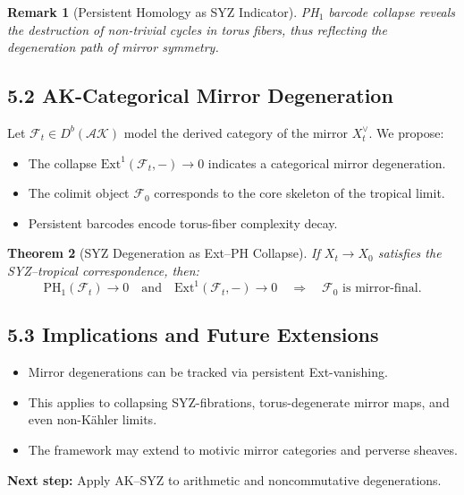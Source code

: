 \documentclass[11pt]{article}
\newtheorem{theorem}{Theorem}[section]
\newtheorem{remark}[theorem]{Remark}
\begin{document}
\begin{remark}[Persistent Homology as SYZ Indicator]
PH$_1$ barcode collapse reveals the destruction of non-trivial cycles in torus fibers, thus reflecting the degeneration path of mirror symmetry.
\end{remark}

\subsection{5.2 AK-Categorical Mirror Degeneration}

Let \( \mathcal{F}_t \in D^b(\mathcal{AK}) \) model the derived category of the mirror \( X_t^\vee \).  
We propose:

\begin{itemize}
    \item The collapse \( \mathrm{Ext}^1(\mathcal{F}_t, -) \to 0 \) indicates a categorical mirror degeneration.
    \item The colimit object \( \mathcal{F}_0 \) corresponds to the core skeleton of the tropical limit.
    \item Persistent barcodes encode torus-fiber complexity decay.
\end{itemize}

\begin{theorem}[SYZ Degeneration as Ext–PH Collapse]
If \( X_t \to X_0 \) satisfies the SYZ–tropical correspondence, then:
\[
\mathrm{PH}_1(\mathcal{F}_t) \to 0 \quad \text{and} \quad \mathrm{Ext}^1(\mathcal{F}_t, -) \to 0 \quad \Rightarrow \quad \mathcal{F}_0 \text{ is mirror-final}.
\]
\end{theorem}

\subsection{5.3 Implications and Future Extensions}

\begin{itemize}
    \item Mirror degenerations can be tracked via persistent Ext-vanishing.
    \item This applies to collapsing SYZ-fibrations, torus-degenerate mirror maps, and even non-Kähler limits.
    \item The framework may extend to motivic mirror categories and perverse sheaves.
\end{itemize}

\textbf{Next step:} Apply AK–SYZ to arithmetic and noncommutative degenerations.
\end{document}
